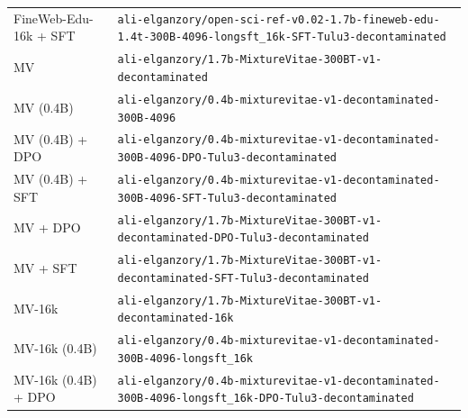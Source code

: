 \begin{table}[ht]
\begin{tabular}{lp{10cm}}
FineWeb-Edu-16k + SFT & \texttt{ali-\allowbreak{}elganzory/\allowbreak{}open-\allowbreak{}sci-\allowbreak{}ref-\allowbreak{}v0.02-\allowbreak{}1.7b-\allowbreak{}fineweb-\allowbreak{}edu-\allowbreak{}1.4t-\allowbreak{}300B-\allowbreak{}4096-\allowbreak{}longsft\_16k-\allowbreak{}SFT-\allowbreak{}Tulu3-\allowbreak{}decontaminated} \\
MV & \texttt{ali-\allowbreak{}elganzory/\allowbreak{}1.7b-\allowbreak{}MixtureVitae-\allowbreak{}300BT-\allowbreak{}v1-\allowbreak{}decontaminated} \\
MV (0.4B) & \texttt{ali-\allowbreak{}elganzory/\allowbreak{}0.4b-\allowbreak{}mixturevitae-\allowbreak{}v1-\allowbreak{}decontaminated-\allowbreak{}300B-\allowbreak{}4096} \\
MV (0.4B) + DPO & \texttt{ali-\allowbreak{}elganzory/\allowbreak{}0.4b-\allowbreak{}mixturevitae-\allowbreak{}v1-\allowbreak{}decontaminated-\allowbreak{}300B-\allowbreak{}4096-\allowbreak{}DPO-\allowbreak{}Tulu3-\allowbreak{}decontaminated} \\
MV (0.4B) + SFT & \texttt{ali-\allowbreak{}elganzory/\allowbreak{}0.4b-\allowbreak{}mixturevitae-\allowbreak{}v1-\allowbreak{}decontaminated-\allowbreak{}300B-\allowbreak{}4096-\allowbreak{}SFT-\allowbreak{}Tulu3-\allowbreak{}decontaminated} \\
MV + DPO & \texttt{ali-\allowbreak{}elganzory/\allowbreak{}1.7b-\allowbreak{}MixtureVitae-\allowbreak{}300BT-\allowbreak{}v1-\allowbreak{}decontaminated-\allowbreak{}DPO-\allowbreak{}Tulu3-\allowbreak{}decontaminated} \\
MV + SFT & \texttt{ali-\allowbreak{}elganzory/\allowbreak{}1.7b-\allowbreak{}MixtureVitae-\allowbreak{}300BT-\allowbreak{}v1-\allowbreak{}decontaminated-\allowbreak{}SFT-\allowbreak{}Tulu3-\allowbreak{}decontaminated} \\
MV-16k & \texttt{ali-\allowbreak{}elganzory/\allowbreak{}1.7b-\allowbreak{}MixtureVitae-\allowbreak{}300BT-\allowbreak{}v1-\allowbreak{}decontaminated-\allowbreak{}16k} \\
MV-16k (0.4B) & \texttt{ali-\allowbreak{}elganzory/\allowbreak{}0.4b-\allowbreak{}mixturevitae-\allowbreak{}v1-\allowbreak{}decontaminated-\allowbreak{}300B-\allowbreak{}4096-\allowbreak{}longsft\_16k} \\
MV-16k (0.4B) + DPO & \texttt{ali-\allowbreak{}elganzory/\allowbreak{}0.4b-\allowbreak{}mixturevitae-\allowbreak{}v1-\allowbreak{}decontaminated-\allowbreak{}300B-\allowbreak{}4096-\allowbreak{}longsft\_16k-\allowbreak{}DPO-\allowbreak{}Tulu3-\allowbreak{}decontaminated} \\

\end{tabular}
\end{table}
